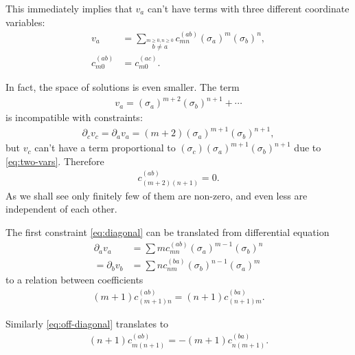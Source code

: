 \documentclass[aps,prd,final,twocolumn,floats,floatfix,nofootinbib,10pt]{revtex4-1}
\begin{document}
This immediately implies that $v_a$ can't have terms with three different
coordinate variables:
\begin{align}
  v_a & = \sum_{\overset{m \geq 0, n \geq 0}{b \neq a}}
  c^{(ab)}_{mn} (\sigma_a)^m (\sigma_b)^n, \\
  c^{(ab)}_{m0} & = c^{(ac)}_{m0}.
\end{align}

In fact, the space of solutions is even smaller. The term
\begin{align}
  v_a = (\sigma_a)^{m + 2} (\sigma_b)^{n + 1} + \cdots
\end{align}
is incompatible with constraints:
\begin{align}
  \partial_c v_c = \partial_a v_a =
    (m + 2) (\sigma_a)^{m + 1} (\sigma_b)^{n + 1},
\end{align}
but $v_c$ can't have a term proportional to
$(\sigma_c) (\sigma_a)^{m + 1} (\sigma_b)^{n + 1}$ due to \eqref{eq:two-vars}.
Therefore
\begin{align} \label{eq:corner}
  c^{(ab)}_{(m + 2)(n + 1)} = 0.
\end{align}
As we shall see only finitely few of them are non-zero, and even less
are independent of each other.

The first constraint \eqref{eq:diagonal} can be translated from differential
equation
\begin{align}
  \partial_a v_a & = \sum m c^{(ab)}_{mn} (\sigma_a)^{m - 1} (\sigma_b)^n \\
  = \partial_b v_b & = \sum n c^{(ba)}_{nm} (\sigma_b)^{n - 1} (\sigma_a)^m
\end{align}
to a relation between coefficients
\begin{align} \label{eq:first-rel}
  (m + 1) c^{(ab)}_{(m + 1) n} = (n+1) c^{(ba)}_{(n + 1) m}.
\end{align}

Similarly \eqref{eq:off-diagonal} translates to
\begin{align} \label{eq:second-rel}
  (n + 1) c^{(ab)}_{m (n + 1)} = -(m + 1) c^{(ba)}_{n (m + 1)}.
\end{align}
\end{document}
